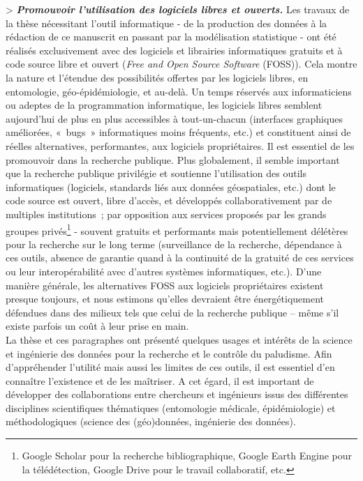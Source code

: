 \documentclass[12pt,twoside]{reedthesis}
\begin{document}
\textgreater{} \textbf{\emph{Promouvoir l'utilisation des logiciels libres et ouverts.}} Les travaux de la thèse nécessitant l'outil informatique - de la production des données à la rédaction de ce manuscrit en passant par la modélisation statistique - ont été réalisés exclusivement avec des logiciels et librairies informatiques gratuits et à code source libre et ouvert (\emph{Free and Open Source Software} (FOSS)). Cela montre la nature et l'étendue des possibilités offertes par les logiciels libres, en entomologie, géo-épidémiologie, et au-delà. Un temps réservés aux informaticiens ou adeptes de la programmation informatique, les logiciels libres semblent aujourd'hui de plus en plus accessibles à tout-un-chacun (interfaces graphiques améliorées, «~bugs~» informatiques moins fréquents, etc.) et constituent ainsi de réelles alternatives, performantes, aux logiciels propriétaires. Il est essentiel de les promouvoir dans la recherche publique. Plus globalement, il semble important que la recherche publique privilégie et soutienne l'utilisation des outils informatiques (logiciels, standards liés aux données géospatiales, etc.) dont le code source est ouvert, libre d'accès, et développés collaborativement par de multiples institutions~; par opposition aux services proposés par les grands groupes privés\footnote{Google Scholar pour la recherche bibliographique, Google Earth Engine pour la télédétection, Google Drive pour le travail collaboratif, etc.} - souvent gratuits et performants mais potentiellement délétères pour la recherche sur le long terme (surveillance de la recherche, dépendance à ces outils, absence de garantie quand à la continuité de la gratuité de ces services ou leur interopérabilité avec d'autres systèmes informatiques, etc.). D'une manière générale, les alternatives FOSS aux logiciels propriétaires existent presque toujours, et nous estimons qu'elles devraient être énergétiquement défendues dans des milieux tels que celui de la recherche publique -- même s'il existe parfois un coût à leur prise en main.\\

La thèse et ces paragraphes ont présenté quelques usages et intérêts de la science et ingénierie des données pour la recherche et le contrôle du paludisme. Afin d'appréhender l'utilité mais aussi les limites de ces outils, il est essentiel d'en connaître l'existence et de les maîtriser. A cet égard, il est important de développer des collaborations entre chercheurs et ingénieurs issus des différentes disciplines scientifiques thématiques (entomologie médicale, épidémiologie) et méthodologiques (science des (géo)données, ingénierie des données).\\
\end{document}
